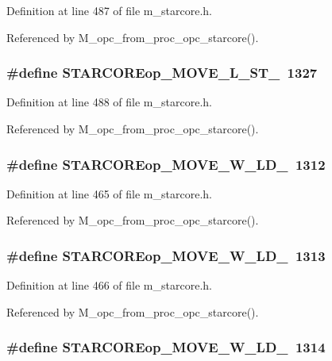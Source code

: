 Definition at line 487 of file m\_\-starcore.h.

Referenced by M\_\-opc\_\-from\_\-proc\_\-opc\_\-starcore().
\subsubsection{\setlength{\rightskip}{0pt plus 5cm}\#define STARCOREop\_\-MOVE\_\-L\_\-ST\_~1327}\label{m__starcore_8h_23dcb8d9c2a981998628ed1d794c0b75}




Definition at line 488 of file m\_\-starcore.h.

Referenced by M\_\-opc\_\-from\_\-proc\_\-opc\_\-starcore().
\subsubsection{\setlength{\rightskip}{0pt plus 5cm}\#define STARCOREop\_\-MOVE\_\-W\_\-LD\_~1312}\label{m__starcore_8h_662155baddf42ba847dbf10b98e721f2}




Definition at line 465 of file m\_\-starcore.h.

Referenced by M\_\-opc\_\-from\_\-proc\_\-opc\_\-starcore().
\subsubsection{\setlength{\rightskip}{0pt plus 5cm}\#define STARCOREop\_\-MOVE\_\-W\_\-LD\_~1313}\label{m__starcore_8h_62d8bce0780df8d44e3ccb80a55bec63}




Definition at line 466 of file m\_\-starcore.h.

Referenced by M\_\-opc\_\-from\_\-proc\_\-opc\_\-starcore().
\subsubsection{\setlength{\rightskip}{0pt plus 5cm}\#define STARCOREop\_\-MOVE\_\-W\_\-LD\_~1314}\label{m__starcore_8h_629b60ea1e327075e8959f45d51278d9}




